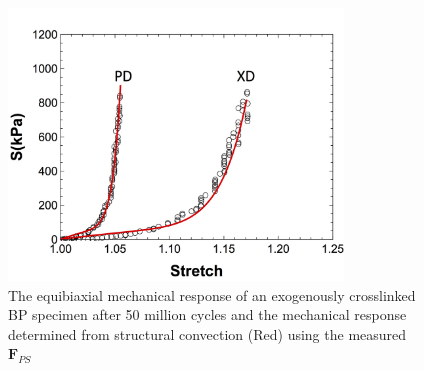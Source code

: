 \begin{figure}[hbt]
\centering
\includegraphics[width=3.5in]{Images/chapter4/figure11}
\caption{The equibiaxial mechanical response of an exogenously crosslinked BP specimen after 50 million cycles and the mechanical response determined from structural convection (Red) using the measured $\textbf{F}_{PS}$}
\label{fig:mechconvec}
\end{figure}



